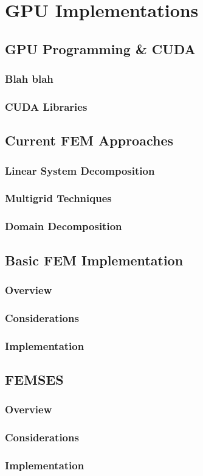\clearpage
\chapter{GPU Implementations}

\section{GPU Programming \& CUDA}

\subsection{Blah blah}

\subsection{CUDA Libraries}

\section{Current FEM Approaches}

\subsection{Linear System Decomposition}

\subsection{Multigrid Techniques}

\subsection{Domain Decomposition}

\section{Basic FEM Implementation}

\subsection{Overview}

\subsection{Considerations}

\subsection{Implementation}

\section{FEMSES}

\subsection{Overview}

\subsection{Considerations}

\subsection{Implementation}